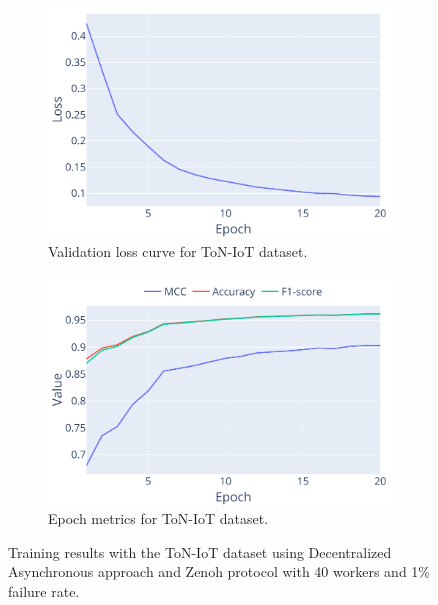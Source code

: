 \begin{figure}[!htb]
    \centering
    \begin{subfigure}[b]{0.49\linewidth}
        \centering
        \includegraphics[width=\linewidth]{figs/scenario3/toniot_loss.pdf}
        \caption{Validation loss curve for ToN-IoT dataset.}
        \label{fig:scenario3_toniot_loss}
    \end{subfigure}
    \hfill
    \begin{subfigure}[b]{0.49\linewidth}
        \centering
        \includegraphics[width=\linewidth]{figs/scenario3/toniot_metrics.pdf}
        \caption{Epoch metrics for ToN-IoT dataset.}
        \label{fig:scenario3_toniot_metrics}
    \end{subfigure}
    \caption[ToN-IoT Training Results with Decentralized Asynchronous FL]{Training results with the ToN-IoT dataset using Decentralized Asynchronous approach and Zenoh protocol with 40 workers and 1\% failure rate.}
    \label{fig:scenario3_toniot_results}
\end{figure}

